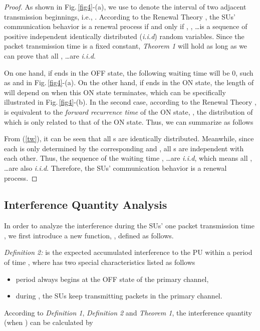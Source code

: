 \documentclass[11pt,draftcls]{IEEEtran}{\onecolumn}
\begin{document}
\begin{proof} As shown in Fig.\,\ref{fig4}-(a), we use  to denote the interval
of two adjacent transmission beginnings, i.e., .
According to the Renewal Theory \cite{renew}, the SUs' communication
behavior is a renewal process if and only if , ,
\dots is a sequence of positive independent identically distributed
(\emph{i.i.d}) random variables. Since the packet transmission time
 is a fixed constant, \emph{Theorem 1} will hold as long as we
can prove that all ,  \dots are \emph{i.i.d}.

On one hand, if  ends in the OFF state, the following
waiting time  will be 0, such as  and  in
Fig.\,\ref{fig4}-(a). On the other hand, if  ends in the ON
state, the length of  will depend on when this ON state
terminates, which can be specifically illustrated in
Fig.\,\ref{fig4}-(b). In the second case, according to the Renewal
Theory \cite{renew},  is equivalent to the \emph {forward
recurrence time} of the ON state, ,
the distribution of which is only related to that of the ON state.
Thus, we can summarize  as follows

From (\ref{tw}), it can be seen that all s are identically
distributed. Meanwhile, since each  is only determined by
the corresponding  and ,
all s are independent with each other. Thus, the sequence of
the waiting time ,  \dots are \emph{i.i.d}, which
means all ,  \dots are also \emph{i.i.d}. Therefore,
the SUs' communication behavior is a renewal process.
\end{proof}

\subsection{Interference Quantity Analysis}

In order to analyze the interference during the SUs' one packet
transmission time , we first introduce a new function, ,
defined as follows.

\emph{Definition 2:}  is the expected accumulated interference
to the PU within a period of time , where  has two special
characteristics listed as follows
\begin{itemize}
\item period  always begins at the OFF state of the primary
channel,
\item during , the SUs keep transmitting packets in the primary channel.
\end{itemize}

According to \emph{Definition 1}, \emph{Definition 2} and
\emph{Theorem 1}, the interference quantity  (when
) can be calculated by
\end{document}

